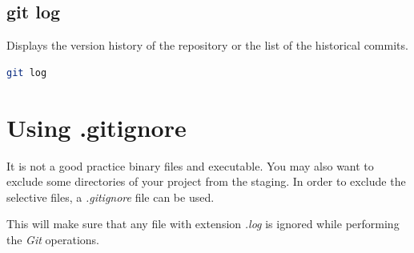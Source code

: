 \documentclass[letterpaper]{article}
\begin{document}
\subsection{git log}
Displays the version history of the repository or the list of the historical commits. 
\begin{lstlisting}[language=Bash]
git log
\end{lstlisting}

\section{Using .gitignore}
It is not a good practice binary files and executable. You may also want to exclude some directories of your project from the staging. In order to exclude the selective files, a \textit{.gitignore} file can be used.

This will make sure that any file with extension \textit{.log} is ignored while performing the \textit{Git} operations. 
\end{document}
